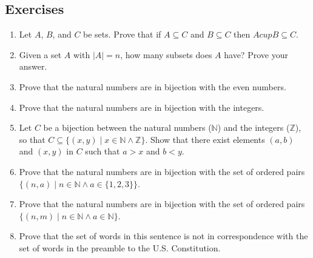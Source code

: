 \subsection{Exercises}
\begin{enumerate}
    \item Let $A$, $B$, and $C$ be sets.  Prove that if $A \subseteq C$ and $B \subseteq C$ then $A cup B \subseteq C$.

    \item Given a set $A$ with $|A|=n$, how many subsets does $A$ have?  Prove your answer.

    \item Prove that the natural numbers are in bijection with the even numbers.

    \item Prove that the natural numbers are in bijection with the integers.

    \item Let $C$ be a bijection between the natural numbers ($\mathbb{N}$) and the integers ($\mathbb{Z}$), so that $C\subseteq\{(x,y)\mid x\in \mathbb{N}\land \mathbb{Z}\}$.  Show that there exist elements $(a, b)$ and $(x,y)$ in $C$ such that $a > x$ and $b < y$.

    \item Prove that the natural numbers are in bijection with the set of ordered pairs $\{(n, a) \mid n\in \mathbb{N} \land a \in \{1,2,3\}\}$.

    \item Prove that the natural numbers are in bijection with the set of ordered pairs $\{(n, m) \mid n\in \mathbb{N} \land a \in \mathbb{N}\}$.

    \item Prove that the set of words in this sentence is not in correspondence with the set of words in the preamble to the U.S. Constitution.
\end{enumerate}

